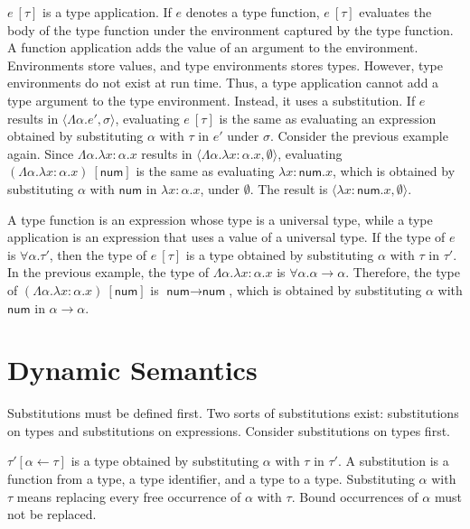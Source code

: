 $e\ [\tau]$ is a type application. If $e$ denotes a type function, \(e\
[\tau]\) evaluates the body of the type function under the environment captured
by the type function. A function application adds the value of an argument to
the environment. Environments store values, and type environments stores types.
However, type environments do not exist at run time. Thus, a type application
cannot add a type argument to the type environment. Instead, it uses
a substitution. If $e$ results in $\langle\Lambda\alpha.e',\sigma\rangle$,
evaluating $e\ [\tau]$ is the same as evaluating an expression obtained by
substituting $\alpha$ with $\tau$ in $e'$ under $\sigma$. Consider the
previous example again. Since $\Lambda\alpha.\lambda x:\alpha.x$ results in
$\langle\Lambda\alpha.\lambda x:\alpha.x,\emptyset\rangle$, evaluating
$(\Lambda\alpha.\lambda x:\alpha.x)\ [\textsf{num}]$ is the same as evaluating
$\lambda x:\textsf{num}.x$, which is obtained by substituting $\alpha$ with
$\textsf{num}$ in $\lambda x:\alpha.x$, under $\emptyset$. The result is
$\langle\lambda x:\textsf{num}.x,\emptyset\rangle$.

A type function is an expression whose type is a universal type, while a type
application is an expression that uses a value of a universal type. If the type
of $e$ is $\forall\alpha.\tau'$, then the type of $e\ [\tau]$ is a type
obtained by substituting $\alpha$ with $\tau$ in $\tau'$. In the previous
example, the type of $\Lambda\alpha.\lambda x:\alpha.x$ is
$\forall\alpha.\alpha\rightarrow\alpha$. Therefore, the type of
$(\Lambda\alpha.\lambda x:\alpha.x)\ [\textsf{num}]$ is \(\textsf{
num}\rightarrow\textsf{num}\), which is obtained by substituting $\alpha$ with
$\textsf{num}$ in $\alpha\rightarrow\alpha$.

\section{Dynamic Semantics}

Substitutions must be defined first. Two sorts of substitutions exist:
substitutions on types and substitutions on expressions. Consider substitutions
on
types first.

$\tau'[\alpha\leftarrow\tau]$ is a type obtained by substituting $\alpha$
with $\tau$ in $\tau'$. A substitution is a function from a type, a type
identifier, and a type to a type. Substituting $\alpha$ with $\tau$ means
replacing every free occurrence of $\alpha$ with $\tau$. Bound occurrences
of $\alpha$ must not be replaced.

